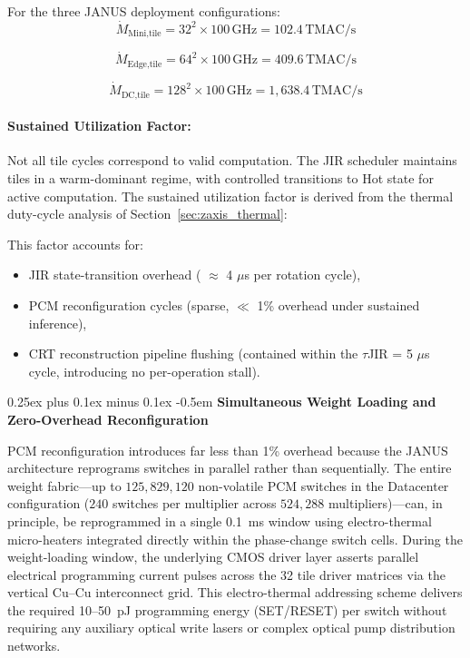 \documentclass[journal]{IEEEtran}
\makeatletter
\newcommand{\subparagraph}{\@startsection{subparagraph}{5}{\parindent}%
  {0.25ex plus 0.1ex minus 0.1ex}%
  {-0.5em}%
  {\normalfont\normalsize\itshape}} %
\makeatother
\begin{document}
For the three JANUS deployment configurations:
\begin{equation}
\dot{M}_{\text{Mini,tile}} = 32^2 \times 100\,\text{GHz} = 102.4\,\text{TMAC/s}
\end{equation}

\begin{equation}
\dot{M}_{\text{Edge,tile}} = 64^2 \times 100\,\text{GHz} = 409.6\,\text{TMAC/s}
\end{equation}

\begin{equation}
\dot{M}_{\text{DC,tile}} = 128^2 \times 100\,\text{GHz} = 1,638.4\,\text{TMAC/s}
\end{equation}

\paragraph{\textbf{Sustained Utilization Factor:}}

Not all tile cycles correspond to valid computation. The JIR scheduler maintains tiles in a warm-dominant regime, with controlled transitions to Hot state for active computation. The sustained utilization factor is derived from the thermal duty-cycle analysis of Section~\ref{sec:zaxis_thermal}:

\begin{center}
\end{center}

This factor accounts for:

\begin{itemize}
\item JIR state-transition overhead ( $\approx$ 4 $\mu$s per rotation cycle),
\item PCM reconfiguration cycles (sparse, $\ll$ 1\% overhead under sustained inference),
\item  CRT reconstruction pipeline flushing (contained within the $\tau$JIR = 5 $\mu$s cycle, introducing no per-operation stall).
\end{itemize}

\subparagraph{\textbf{Simultaneous Weight Loading and Zero-Overhead Reconfiguration}}

PCM reconfiguration introduces far less than 1\% overhead because the JANUS architecture reprograms switches in parallel rather than sequentially. The entire weight fabric---up to $125,829,120$ non-volatile PCM switches in the Datacenter configuration ($240$ switches per multiplier across $524,288$ multipliers)---can, in principle, be reprogrammed in a single 0.1~ms window using electro-thermal micro-heaters integrated directly within the phase-change switch cells. During the weight-loading window, the underlying CMOS driver layer asserts parallel electrical programming current pulses across the 32 tile driver matrices via the vertical Cu--Cu interconnect grid. This electro-thermal addressing scheme delivers the required 10--50~pJ programming energy (SET/RESET) per switch without requiring any auxiliary optical write lasers or complex optical pump distribution networks.
\end{document}
